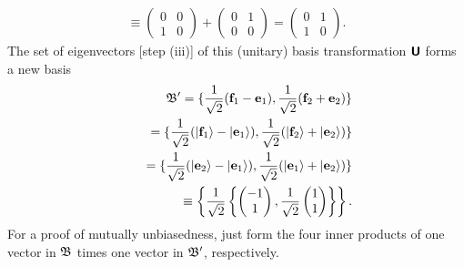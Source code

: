 {\begin{equation}
\begin{split}
   \\
\equiv
\begin{pmatrix}
0&0\\1&0
\end{pmatrix}
+
\begin{pmatrix}
0&1\\0&0
\end{pmatrix}
=
\begin{pmatrix}
0&1\\1&0
\end{pmatrix}.
\end{split}
\end{equation}
The set of eigenvectors [step (iii)] of this  (unitary) basis transformation $\textsf{\textbf{U}}$ forms a new basis
\begin{equation}
\begin{split}
{\frak B}' =
\{ \frac{1}{\sqrt{2}} ({\bf f}_1 - {\bf e}_1),
 \frac{1}{\sqrt{2}}( {\bf f}_2 + {\bf e}_2 )\}
\\
 \qquad =
\{ \frac{1}{\sqrt{2}} (\vert {\bf f}_1\rangle  - \vert {\bf e}_1\rangle ),
 \frac{1}{\sqrt{2}}(\vert  {\bf f}_2 \rangle + \vert {\bf e}_2\rangle  )\}
\\
 \qquad  =
\{ \frac{1}{\sqrt{2}} (\vert {\bf e}_2\rangle  - \vert {\bf e}_1\rangle ),
 \frac{1}{\sqrt{2}}(\vert  {\bf e}_1 \rangle + \vert {\bf e}_2\rangle  )\}
\\
 \qquad \equiv \left\{ \frac{1}{\sqrt{2}}\left\{\begin{pmatrix}-1\\1\end{pmatrix},\frac{1}{\sqrt{2}}\begin{pmatrix}1\\1\end{pmatrix}\right\}\right\}.
\end{split}
\end{equation}
For a proof of mutually unbiasedness, just form the four inner products of one vector in ${\frak B}$ times one vector in ${\frak B}'$,
respectively.

}
